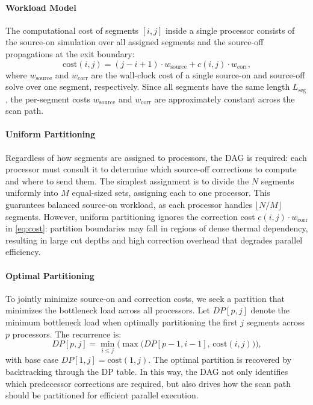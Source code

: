 \documentclass[conference]{IEEEtran}
\begin{document}
\paragraph{Workload Model}
The computational cost of segments $[i, j]$ inside a single processor consists of the source-on simulation over all assigned segments and the source-off propagations at the exit boundary:
\begin{equation}
\mathrm{cost}(i,j) = (j-i+1) \cdot w_{\mathrm{source}} + c(i,j) \cdot w_{\mathrm{corr}},
\label{eq:cost}
\end{equation}
where $w_{\mathrm{source}}$ and $w_{\mathrm{corr}}$ are the wall-clock cost of a single source-on and source-off solve over one segment, respectively. Since all segments have the same length $L_{\mathrm{seg}}$, the per-segment costs $w_{\mathrm{source}}$ and $w_{\mathrm{corr}}$ are approximately constant across the scan path.

\paragraph{Uniform Partitioning}
Regardless of how segments are assigned to processors, the DAG is required: each processor must consult it to determine which source-off corrections to compute and where to send them. The simplest assignment is to divide the $N$ segments uniformly into $M$ equal-sized sets, assigning each to one processor. This guarantees balanced source-on workload, as each processor handles $\lfloor N/M \rfloor$ segments. However, uniform partitioning ignores the correction cost $c(i,j) \cdot w_{\mathrm{corr}}$ in \cref{eq:cost}: partition boundaries may fall in regions of dense thermal dependency, resulting in large cut depths and high correction overhead that degrades parallel efficiency.

\paragraph{Optimal Partitioning}
To jointly minimize source-on and correction costs, we seek a partition that
minimizes the bottleneck load across all processors. Let $DP[p,j]$ denote
the minimum bottleneck load when optimally partitioning the first $j$
segments across $p$ processors. The recurrence is:
\begin{equation}
DP[p,j] = \min_{i \leq j} \Big( \max \big( DP[p-1,i-1],\, \mathrm{cost}(i,j) \big) \Big),
\label{eq:dp_recurrence}
\end{equation}
with base case $DP[1,j] = \mathrm{cost}(1,j)$. The optimal partition is
recovered by backtracking through the DP table. In this way, the DAG not only identifies which predecessor corrections are required, but also drives how the scan path should be partitioned for efficient parallel execution.
\end{document}

